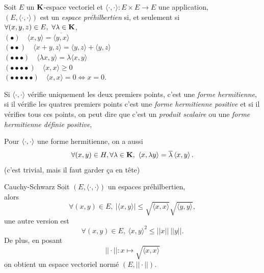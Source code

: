 \documentclass[a4paper,11pt, twoside]{article}
\begin{document}
\begin{Def}
  Soit $E$ un $\mathbf K$-espace vectoriel et $\langle \cdot,\cdot\rangle:E\times E\longrightarrow E$ une application,\\

  $(E,\langle \cdot,\cdot\rangle)$ est un \emph{espace préhilbertien} si, et seulement si \\
  $\forall (x,y,z)\in E,\ \forall \lambda\in\mathbf K$,\\
  $(\bullet)\quad \langle x,y\rangle =\overline{\langle y,x\rangle}$\\
  $(\bullet\bullet)\quad \langle x+y,z\rangle =\langle y,z\rangle+\langle y,z\rangle$\\
  $(\bullet\bullet\bullet)\quad \langle \lambda x,y\rangle =\lambda\langle x,y\rangle$\\
  $(\bullet\bullet\bullet\bullet)\quad \langle x,x\rangle \geqslant 0$\\
  $(\bullet\bullet\bullet\bullet\bullet)\quad \langle x,x\rangle = 0\Leftrightarrow x=0.$\\
\end{Def}


\begin{RQ}
  Si $\langle \cdot,\cdot\rangle$ vérifie uniquement les deux premiers points, c'est une \emph{forme hermitienne}, si il vérifie les quatres premiers points c'est une \emph{forme hermitienne positive} et si il vérifies tous ces points, on peut dire que c'est un \emph{produit scalaire} ou une \emph{forme hermitienne définie positive}, 
\end{RQ}


\begin{RQ}
  Pour $\left\langle \cdot,\cdot \right\rangle$ une forme hermitienne, on a aussi 
  $$\forall (x,y)\in H,\forall \lambda\in \mathbf K,\ \left\langle x,\lambda y \right\rangle=\overline{\lambda}\left\langle x,y \right\rangle.$$
  (c'est trivial, mais il faut garder ça en tête)
\end{RQ}


\begin{propC}{Cauchy-Schwarz}
  Soit $(E,\langle \cdot,\cdot\rangle)$ un espaces préhilbertien,\\

  alors 
  $$\forall (x,y)\in E,\ |\langle x,y\rangle|\leqslant \sqrt{\langle x,x\rangle}\sqrt{\langle y,y\rangle},$$
  une autre version est 
  $$\forall (x,y)\in E,\ \langle x,y\rangle^2\leqslant ||x||\ ||y||.$$
  De plus, en posant 
  $$||\cdot||:x\longmapsto \sqrt{\langle x,x\rangle}$$
  on obtient un espace vectoriel normé $(E,||\cdot||)$.
\end{propC}
\end{document}
